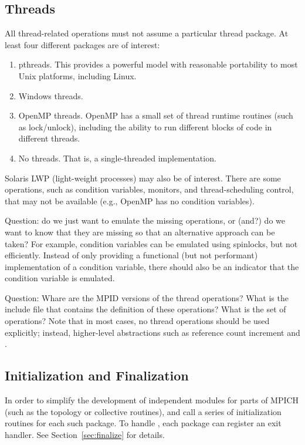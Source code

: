 \documentclass{article}
\begin{document}
\subsection{Threads}
\label{sec:threads}
All thread-related operations must not assume a particular thread
package.  At least four different packages are of interest:
\begin{enumerate}
\item pthreads.  This provides a powerful model with reasonable
portability to most Unix platforms, including Linux.  
\item Windows threads.  
\item OpenMP threads.  OpenMP has a small set of thread runtime
routines (such as lock/unlock), including the ability to run different blocks
of code in different threads.
\item No threads.  That is, a single-threaded implementation.  
\end{enumerate}
Solaris LWP (light-weight processes) may also be of interest.
There are some operations, such as condition variables, monitors, and
thread-scheduling control, that may not be available (e.g., OpenMP
has no condition variables).  

Question: do we just want to emulate the missing operations, or (and?)
do we want to know that they are missing so that an alternative
approach can be taken?  For example, condition variables can be emulated using
spinlocks, but not efficiently.  Instead of only providing a functional (but
not performant) implementation of a condition variable, there should also be
an indicator that the condition variable is emulated.

Question: Whare are the MPID versions of the thread operations?  What
is the include file that contains the definition of these operations?
What is the set of operations?  Note that in most cases, no thread
operations should be used explicitly; instead, higher-level
abstractions such as reference count increment and
. 

\subsection{Initialization and Finalization}
\label{sec:initialization}
In order to simplify the development of independent modules for parts
of MPICH (such as the topology or collective routines),
 and  call a series of
initialization routines for each such package.  To handle
, each package can register an exit handler.  See
Section~\ref{sec:finalize} for details.
\end{document}
